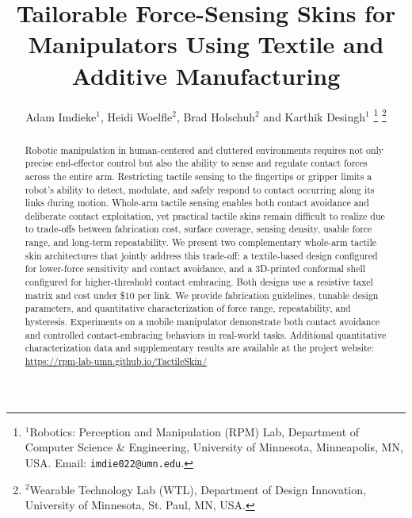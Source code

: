 \documentclass[letterpaper, 10 pt, conference]{ieeeconf}
\title{\LARGE \bf Tailorable Force-Sensing Skins for Manipulators Using Textile and Additive Manufacturing
}
\author{Adam Imdieke$^{1}$, Heidi Woelfle$^{2}$, Brad Holschuh$^{2}$ and Karthik Desingh$^{1}$%
\thanks{$^{1}$Robotics: Perception and Manipulation (RPM) Lab, Department of Computer Science \& Engineering, University of Minnesota, Minneapolis, MN, USA. Email: {\tt\small imdie022@umn.edu}.}%
\thanks{$^{2}$Wearable Technology Lab (WTL), Department of Design Innovation, University of Minnesota, St. Paul, MN, USA.}}
\begin{document}
\maketitle
\thispagestyle{empty}
\pagestyle{empty}


\begin{abstract}
Robotic manipulation in human-centered and cluttered environments requires not only precise end-effector control but also the ability to sense and regulate contact forces across the entire arm. Restricting tactile sensing to the fingertips or gripper limits a robot's ability to detect, modulate, and safely respond to contact occurring along its links during motion. Whole-arm tactile sensing enables both contact avoidance and deliberate contact exploitation, yet practical tactile skins remain difficult to realize due to trade-offs between fabrication cost, surface coverage, sensing density, usable force range, and long-term repeatability.
We present two complementary whole-arm tactile skin architectures that jointly address this trade-off: a textile-based design configured for lower-force sensitivity and contact avoidance, and a 3D-printed conformal shell configured for higher-threshold contact embracing. Both designs use a resistive taxel matrix and cost under \$10 per link. We provide fabrication guidelines, tunable design parameters, and quantitative characterization of force range, repeatability, and hysteresis. Experiments on a mobile manipulator demonstrate both contact avoidance and controlled contact-embracing behaviors in real-world tasks.
Additional quantitative characterization data and supplementary results are available at the project website: \url{https://rpm-lab-umn.github.io/TactileSkin/}
\end{abstract} 



 









\end{document}

